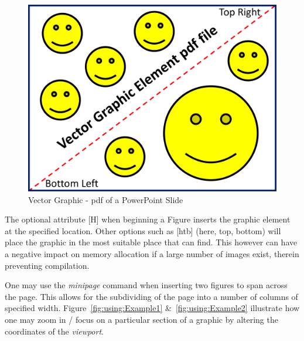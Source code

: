 \begin{figure}[H]
\centering
\includegraphics[width=.4\linewidth]{usingLatex/images/VectorGraphicElementPDF.pdf}
\caption{Vector Graphic - pdf of a PowerPoint Slide}
\label{fig:using:VectorGraphicElementPDF}
\end{figure}

The optional attribute [H] when beginning a Figure inserts the graphic element at the specified location. Other options such as [htb] (here, top, bottom) will place the graphic in the most suitable place that \latex can find. This however can have a negative impact on memory allocation if a large number of images exist, therein preventing compilation.



One may use the \emph{minipage} command when inserting two figures to span across the page. This allows for the subdividing of the page into a number of columns of specified width. Figure~\ref{fig:using:Example1} \&~\ref{fig:using:Example2} illustrate how one may zoom in / focus on a particular section of a graphic by altering the coordinates of the \emph{viewport}. 

